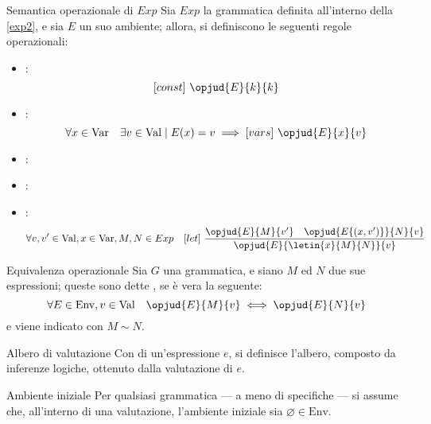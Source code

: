 \documentclass[a4paper, 12pt]{report}
\begin{document}
    \begin{framedprop}[label={exp2 clauses}]{Semantica operazionale di $Exp$}
        Sia $Exp$ la grammatica definita all'interno della \cref{exp2}, e sia $E$ un suo ambiente; allora, si definiscono le seguenti regole operazionali:
        
        \begin{itemize}
            \item {}: $$[const] \ \opjud{E}{k}{k}$$
            \item {}: $$\forall x \in \mathrm{Var} \quad \exists v \in \mathrm{Val} \mid E(x) = v \implies [vars] \ \opjud{E}{x}{v}$$
            \item {}: 
            \item {}: 
            \item {}: $$\forall v, v' \in \mathrm{Val}, x \in \mathrm{Var}, M, N \in Exp \quad [let] \ \dfrac{\opjud{E}{M}{v'} \quad \opjud{E\{(x, v')\}}{N}{v}}{\opjud{E}{\letin{x}{M}{N}}{v}}$$
        \end{itemize}
    \end{framedprop}

    \begin{frameddefn}{Equivalenza operazionale}
        Sia $G$ una grammatica, e siano $M$ ed $N$ due sue espressioni; queste sono dette , se è vera la seguente: $$\forall E \in \mathrm{Env}, v \in \mathrm{Val} \quad \opjud{E}{M}{v} \iff \opjud{E}{N}{v}$$ e viene indicato con $M \sim N$.
    \end{frameddefn}

    \begin{frameddefn}{Albero di valutazione}
        Con  di un'espressione $e$, si definisce l'albero, composto da inferenze logiche, ottenuto dalla valutazione di $e$.
    \end{frameddefn}

    \begin{framedobs}{Ambiente iniziale}
        Per qualsiasi grammatica --- a meno di specifiche --- si assume che, all'interno di una valutazione, l'ambiente iniziale sia $\varnothing \in \mathrm{Env}$.
    \end{framedobs}
\end{document}

